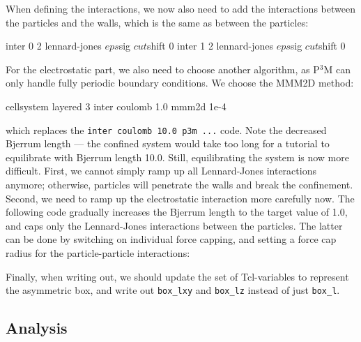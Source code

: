 \documentclass[
a4paper,                        %
11pt,                           %
twoside,                        %
footsepline,                    %
headsepline,                    %
headexclude,                    %
footexclude,                    %
pagesize,                       %
]{scrartcl}
\begin{document}
When defining the interactions, we now also need to add the
interactions between the particles and the walls, which is the same as
between the particles:

\begin{tclcode}
  inter 0 2 lennard-jones $eps $sig $cut $shift 0
  inter 1 2 lennard-jones $eps $sig $cut $shift 0
\end{tclcode}

For the electrostatic part, we also need to choose another algorithm,
as P$^3$M can only handle fully periodic boundary conditions. We
choose the MMM2D method:

\begin{tclcode}
  cellsystem layered 3
  inter coulomb 1.0 mmm2d 1e-4  
\end{tclcode}

which replaces the \verb|inter coulomb 10.0 p3m ...| code. Note the
decreased Bjerrum length --- the confined system would take too long for
a tutorial to equilibrate with Bjerrum length 10.0. Still,
equilibrating the system is now more difficult. First, we cannot
simply ramp up all Lennard-Jones interactions anymore; otherwise,
particles will penetrate the walls and break the confinement. Second,
we need to ramp up the electrostatic interaction more carefully
now. The following code gradually increases the Bjerrum length to the
target value of 1.0, and caps only the Lennard-Jones interactions
between the particles. The latter can be done by switching on
individual force capping, and setting a force cap radius for the
particle-particle interactions:


Finally, when writing out, we should update the set of
Tcl-variables to represent the asymmetric box, and write out
\verb|box_lxy| and \verb|box_lz| instead of just \verb|box_l|.

\subsection*{Analysis}
\end{document}
